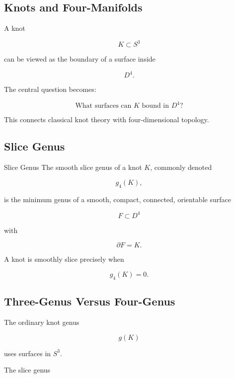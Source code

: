 \subsection{Knots and Four-Manifolds}
\label{subsec:knots-four-manifolds}

A knot

\[
K\subset S^3
\]

can be viewed as the boundary of a surface inside

\[
D^4.
\]

The central question becomes:

\[
\boxed{
\text{What surfaces can }K\text{ bound in }D^4?
}
\]

This connects classical knot theory with four-dimensional topology.

\subsection{Slice Genus}
\label{subsec:slice-genus}

\begin{definitionbox}{Slice Genus}
The smooth slice genus of a knot \(K\), commonly denoted

\[
\boxed{
g_4(K),
}
\]

is the minimum genus of a smooth, compact, connected, orientable surface

\[
F\subset D^4
\]

with

\[
\partial F=K.
\]
\end{definitionbox}

A knot is smoothly slice precisely when

\[
\boxed{
g_4(K)=0.
}
\]

\subsection{Three-Genus Versus Four-Genus}
\label{subsec:three-genus-four-genus}

The ordinary knot genus

\[
g(K)
\]

uses surfaces in \(S^3\).

The slice genus


